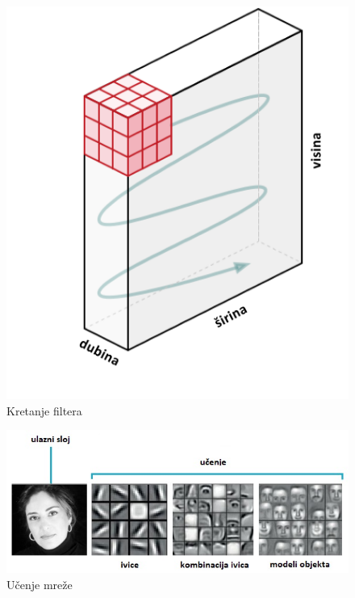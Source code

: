 \documentclass[a4paper]{article}
\begin{document}
\begin{figure}[h!]
\begin{center}
\includegraphics[scale=0.4]{filter_movement01.jpg}
\end{center}
\caption{Kretanje filtera}
\label{fig:filter_movement01}
\end{figure}



\begin{figure}[h!]
\begin{center}
\includegraphics[scale=0.9]{learning.jpg}
\end{center}
\caption{Učenje mreže}
\label{fig:learning}
\end{figure}
\end{document}
